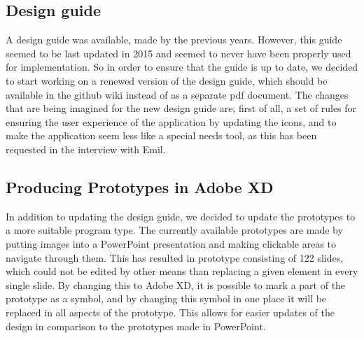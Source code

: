 \subsection{Design guide}
A design guide was available, made by the previous years.
However, this guide seemed to be last updated in 2015 and seemed to never have been properly used for implementation.
So in order to ensure that the guide is up to date, we decided to start working on a renewed version of the design guide, which should be available in the github wiki instead of as a separate pdf document.
The changes that are being imagined for the new design guide are, first of all, a set of rules for ensuring the user experience of the application by updating the icons, and to make the application seem less like a special needs tool, as this has been requested in the interview with Emil.

\subsection{Producing Prototypes in Adobe XD}
In addition to updating the design guide, we decided to update the prototypes to a more suitable program type.
The currently available prototypes are made by putting images into a PowerPoint presentation and making clickable areas to navigate through them.
This has resulted in prototype consisting of 122 slides, which could not be edited by other means than replacing a given element in every single slide.
By changing this to Adobe XD, it is possible to mark a part of the prototype as a symbol, and by changing this symbol in one place it will be replaced in all aspects of the prototype.
This allows for easier updates of the design in comparison to the prototypes made in PowerPoint.
